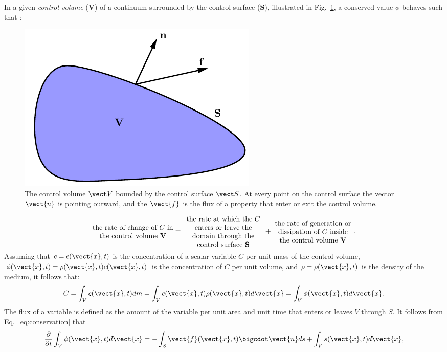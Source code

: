 In a given \textit{control volume} ($\mathbf{V}$) of a continuum surrounded by the control surface ($\mathbf{S}$), illustrated in Fig.~\ref{fig:CV}, a conserved value $\phi$ behaves such that :
\begin{figure}[H]
	\begin{center}
		\includegraphics[width=.4\linewidth]{images/CV.pdf}
	\end{center}
	\caption{The control volume $\vect V$ bounded by the control surface $\vect S$. At every point on the control surface the vector $\vect {n}$ is pointing outward, and the $\vect{f}$ is the flux of a property that enter or exit the control volume.}
	\label{fig:CV}
\end{figure}
\begin{equation}
\parbox{4cm}{\centering the rate of change of $C$  in the control volume $\mathbf{V}$} = 
\parbox{4cm}{\centering the rate at which the $C$ enters or leave the domain through the control surface $\mathbf{S}$ } +
\parbox{4cm}{\centering the rate of generation or dissipation of $C$  inside the control volume $\mathbf{V}$}.  \label{eq:conservation}
\end{equation}
Assuming that $c=c(\vect{x},t)$ is the concentration of a scalar variable $C$ per unit mass of the control volume, $\phi(\vect{x},t)=\rho(\vect{x},t) c(\vect{x},t) $ is the concentration of $C$ per unit volume, and $\rho=\rho(\vect{x},t)$ is the density of the medium, it follows that:
\begin{equation}
C=\int_{V} c(\vect{x},t) dm= \int_{V} c(\vect{x},t) \rho(\vect{x},t) d{\vect{x}} = \int_{V} \phi (\vect{x},t) d{\vect{x}} .
\label{eq:Concentration}
\end{equation}
The flux of a variable is defined as the amount of the variable per unit area and unit time that enters or leaves ${V}$ through ${S}$. It follows from Eq.~\ref{eq:conservation} that
 \begin{equation}
\frac{\partial}{\partial t} \int_{{V}} \phi (\vect{x},t) d{\vect{x}}= 
- \int_{{S}} \vect{f}(\vect{x},t) \bigcdot \vect{n} ds+
\int_{{V}} s (\vect{x},t) d{\vect{x}},
\label{eq:conservation_integral}
\end{equation}
